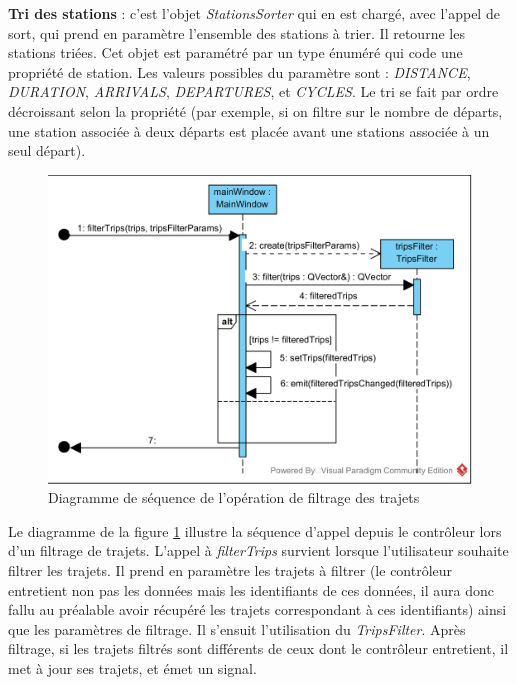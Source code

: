 \documentclass[12pt]{article}
\begin{document}
	\textbf{Tri des stations} : c’est l’objet \textit{StationsSorter} qui en est chargé, avec l’appel de sort, qui prend en paramètre l’ensemble des stations à trier. Il retourne les stations triées. Cet objet est paramétré par un type énuméré qui code une propriété de station. Les valeurs possibles du paramètre sont : \textit{DISTANCE}, \textit{DURATION}, \textit{ARRIVALS}, \textit{DEPARTURES}, et \textit{CYCLES}. Le tri se fait par ordre décroissant selon la propriété (par exemple, si on filtre sur le nombre de départs, une station associée à deux départs est placée avant une stations associée à un seul départ).\\
	
	\begin{figure}[!h]
	\begin{center}
	\includegraphics[scale=1]{dia_sequence_filterTrips.png}
	\caption{Diagramme de séquence de l’opération de filtrage des trajets}
	\label{fig:filterTrips}
	\end{center}
	\end{figure}

	Le diagramme de la figure \ref{fig:filterTrips} illustre la séquence d’appel depuis le contrôleur lors d’un filtrage de trajets. L’appel à \textit{filterTrips} survient lorsque l’utilisateur souhaite filtrer les trajets. Il prend en paramètre les trajets à filtrer (le contrôleur entretient non pas les données mais les identifiants de ces données, il aura donc fallu au préalable avoir récupéré les trajets correspondant à ces identifiants) ainsi que les paramètres de filtrage. Il s’ensuit l’utilisation du \textit{TripsFilter}. Après filtrage, si les trajets filtrés sont différents de ceux dont le contrôleur entretient, il met à jour ses trajets, et émet un signal.\\
	
\end{document}
